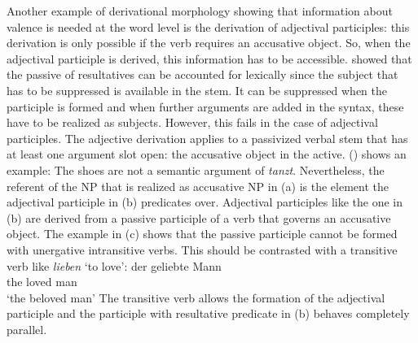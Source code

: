 Another example of derivational morphology showing that information about valence is needed at the
word level is the derivation of adjectival participles: this derivation is only possible if the verb
requires an accusative object. So, when the adjectival participle is derived, this information has
to be accessible.
\citet{Alsina96a} showed that the passive of resultatives can be accounted for lexically since the
subject that has to be suppressed is available in the stem. It can be suppressed when the participle
is formed and when further arguments are added in the syntax, these have to be realized as
subjects. However, this fails in the case of adjectival participles. The adjective derivation
applies to a passivized verbal stem that has at least one argument slot open: the accusative object
in the active. () shows an example:
\eal
{}
\zl
The shoes are not a semantic argument of \emph{tanzt}. Nevertheless, the referent of the NP that is realized as
accusative NP in (a) is the element the adjectival participle in (b) predicates
over. Adjectival participles like the one in (b) are derived from a passive participle of a
verb that governs an accusative object. The example in (c) shows that the passive participle cannot
be formed with unergative intransitive verbs. This should be contrasted with a transitive verb like
\emph{lieben} `to love':
\ea
\gll der geliebte Mann\\
     the loved    man\\
\glt `the beloved man'
\z
The transitive verb allows the formation of the adjectival participle and the participle with
resultative predicate in (b) behaves completely parallel.

